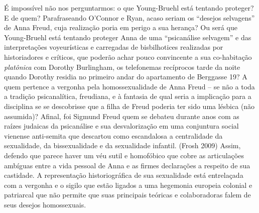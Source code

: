 É impossível não nos perguntarmos: o que Young-Bruehl está tentando
proteger? E de quem? Parafraseando O'Connor e Ryan, acaso seriam os
``desejos selvagens'' de Anna Freud, cuja realização poria em perigo a sua
herança? Ou será que Young-Bruehl está tentando proteger Anna de uma
``psicanálise selvagem'' e das interpretações voyeurísticas e carregadas
de bisbilhotices realizadas por historiadores e críticos, que poderão
achar pouco convincente a sua co-habitação \emph{platônica} com Dorothy
Burlingham, os telefonemas recíprocos tarde da noite quando Dorothy
residia no primeiro andar do apartamento de Berggasse 19? A quem
pertence a vergonha pela homossexualidade de Anna Freud -- se não a toda
a tradição psicanalítica, freudiana, e à fantasia de qual seria a
implicação para a disciplina se se descobrisse que a filha de Freud
poderia ter sido uma lésbica (não assumida)? Afinal, foi Sigmund Freud
quem se debateu durante anos com as raízes judaicas da psicanálise e sua
desvalorização em uma conjuntura social vienense anti-semita que
descartou como escandalosa a centralidade da sexualidade, da
bissexualidade e da sexualidade infantil. (Frosh 2009) Assim, defendo
que parece haver um véu sutil e homofóbico que cobre as articulações
ambíguas entre a vida pessoal de Anna e as firmes declarações a respeito
de sua castidade. A representação historiográfica de sua sexualidade
está entrelaçada com a vergonha e o sigilo que estão ligados a uma
hegemonia europeia colonial e patriarcal que não permite que suas
principais teóricas e colaboradoras falem de seus desejos homossexuais.

